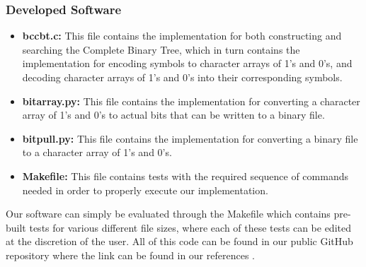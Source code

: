 \documentclass[12pt]{IEEEtran}
\begin{document}
\subsubsection{Developed Software}
\begin{itemize}
\item \textbf{bccbt.c:} This file contains the implementation for both constructing and searching the Complete Binary Tree,
which in turn contains the implementation for encoding symbols to character arrays of 1's and 0's,
and decoding character arrays of 1's and 0's into their corresponding symbols.
\item \textbf{bitarray.py:} This file contains the implementation for converting a character array of 1's and 0's
to actual bits that can be written to a binary file.
\item \textbf{bitpull.py:} This file contains the implementation for converting a binary file to a character
array of 1's and 0's.
\item \textbf{Makefile:} This file contains tests with the required sequence of commands needed
in order to properly execute our implementation.
\end{itemize}
Our software can simply be evaluated through the Makefile which contains pre-built tests for various different file sizes,
where each of these tests can be edited at the discretion of the user. All of this code can be found in our public
GitHub repository where the link can be found in our references \cite{GitHub}.
\end{document}
